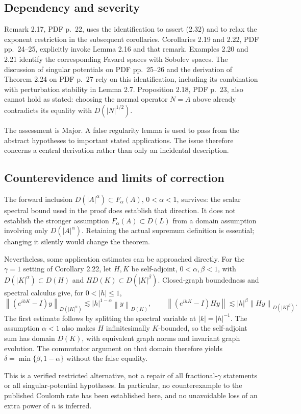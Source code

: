 \documentclass[10pt]{article}
\begin{document}
\subsection*{Dependency and severity}
Remark 2.17, PDF p. 22, uses the identification to assert (2.32) and to relax the exponent restriction in the subsequent corollaries. Corollaries 2.19 and 2.22, PDF pp. 24–25, explicitly invoke Lemma 2.16 and that remark. Examples 2.20 and 2.21 identify the corresponding Favard spaces with Sobolev spaces. The discussion of singular potentials on PDF pp. 25–26 and the derivation of Theorem 2.24 on PDF p. 27 rely on this identification, including its combination with perturbation stability in Lemma 2.7. Proposition 2.18, PDF p. 23, also cannot hold as stated: choosing the normal operator \(N=A\) above already contradicts its equality with \(D(|N|^{1/2})\).\par
The assessment is Major. A false regularity lemma is used to pass from the abstract hypotheses to important stated applications. The issue therefore concerns a central derivation rather than only an incidental description.\par
\subsection*{Counterevidence and limits of correction}
The forward inclusion \(D(|A|^\alpha)\subset F_\alpha(A)\), \(0<\alpha<1\), survives: the scalar spectral bound used in the proof does establish that direction. It does not establish the stronger assumption \(F_\alpha(A)\subset D(L)\) from a domain assumption involving only \(D(|A|^\alpha)\). Retaining the actual supremum definition is essential; changing it silently would change the theorem.\par
Nevertheless, some application estimates can be approached directly. For the \(\gamma=1\) setting of Corollary 2.22, let \(H,K\) be self-adjoint, \(0<\alpha,\beta<1\), with \(D(|K|^\alpha)\subset D(H)\) and \(HD(K)\subset D(|K|^\beta)\). Closed-graph boundedness and spectral calculus give, for \(0<|h|\le1\), \[\left\lVert(e^{ihK}-I)y\right\rVert_{D(|K|^\alpha)}
 \lesssim |h|^{1-\alpha}\left\lVert y\right\rVert_{D(K)},\qquad
 \left\lVert(e^{ihK}-I)Hy\right\rVert
 \lesssim |h|^\beta\left\lVert Hy\right\rVert_{D(|K|^\beta)} .\] The first estimate follows by splitting the spectral variable at \(|k|=|h|^{-1}\). The assumption \(\alpha<1\) also makes \(H\) infinitesimally \(K\)-bounded, so the self-adjoint sum has domain \(D(K)\), with equivalent graph norms and invariant graph evolution. The commutator argument on that domain therefore yields \(\delta=\min\{\beta,1-\alpha\}\) without the false equality.\par
This is a verified restricted alternative, not a repair of all fractional-\(\gamma\) statements or all singular-potential hypotheses. In particular, no counterexample to the published Coulomb rate has been established here, and no unavoidable loss of an extra power of \(n\) is inferred.\par
\end{document}
